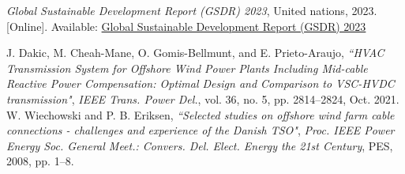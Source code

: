 \documentclass[a4paper,11pt, titlepage, twoside]{article}
\begin{document}
 \begin{thebibliography}{99}\label{biblio}
 

 \textit{Global Sustainable Development Report (GSDR) 2023}, United nations, 2023. [Online]. 
 Available: \href{https://sdgs.un.org/gsdr/gsdr2023}{Global Sustainable Development Report (GSDR) 2023}
 
 {J. Dakic, M. Cheah-Mane, O. Gomis-Bellmunt, and E. Prieto-Araujo},
\textit{“HVAC Transmission System for Offshore Wind Power Plants Including
 Mid-cable Reactive Power Compensation: Optimal Design and Comparison to VSC-HVDC transmission"}, \textit{IEEE Trans. Power Del.}, vol. 36,
 no. 5, pp. 2814–2824, Oct. 2021.
 {W. Wiechowski and P. B. Eriksen},
\textit{“Selected studies on offshore wind farm
cable connections - challenges and experience of the Danish TSO"}, \textit{Proc.
IEEE Power Energy Soc. General Meet.: Convers. Del. Elect. Energy the
21st Century}, PES, 2008, pp. 1–8.

 

 \end{thebibliography}
 
 
\end{document}
